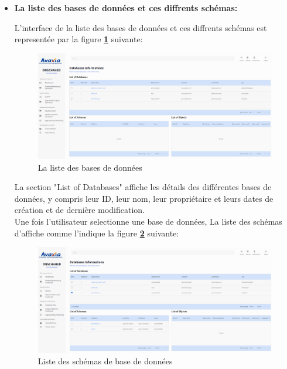 \begin{itemize}
        \item \textbf{La liste des bases de données et ces diffrents schémas:}
        \par L'interface de la liste des bases de données et ces diffrents schémas est representée par la figure \textbf{\ref{fig:dblist}} suivante:
        \begin{figure}[H]
            \centering
            \includegraphics[width =1\linewidth]{img/captures/database/1.png}
            \caption{La liste des bases de données}
                \label{fig:dblist}
            \end{figure}
            \par La section "List of Databases" affiche les détails des différentes bases de données, y compris leur ID, leur nom, leur propriétaire et leurs dates de création et de dernière modification.\\ 
            Une fois l'utilisateur selectionne une base de données, La liste des schémas d'affiche comme l'indique la figure \textbf{\ref{fig:schemas}} suivante:
                \begin{figure}[H]
                \centering
                \includegraphics[width =1\linewidth]{img/captures/database/2.png}
                \caption{Liste des schémas de base de données}
                    \label{fig:schemas}
                \end{figure}


\end{itemize}
